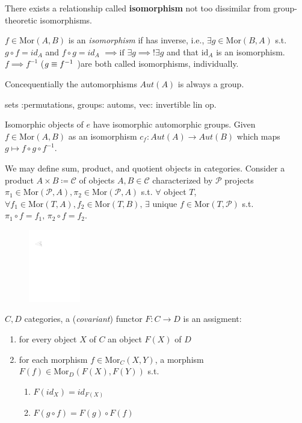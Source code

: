 \documentclass{article}
\begin{document}
There exists a relationship called \textbf{isomorphism} not too dissimilar from group-theoretic isomorphisms. 

\begin{definition}[Isomorphism]
  \( f \in  \text{Mor}(A,B) \) is an \textit{isomorphism} if has inverse, i.e., \( \exists g \in  \text{Mor}(B,A) \) s.t. \( g \circ f =id_A \) and \( f \circ g =id_A \) \( \implies \text{if }\exists g \implies !\exists g \) and that \( \text{id}_A \) is an isomorphism. \( f \implies f^{-1} \) (\( g\equiv f^{-1} \\ \) )are both called isomorphisms, individually. 
  
\end{definition}
  Concequentially the automorphisms \( Aut(A) \) is always a group. 

sets :permutations, groups: automs, vec: invertible lin op. 

Isomorphic objects of \( e \) have isomorphic automorphic groups. Given \( f \in  \text{Mor}(A,B) \) as an isomorphism \( c_f:Aut(A) \to  Aut(B) \) which maps \( g \mapsto f \circ g \circ f^{-1} \). 

We may define sum, product, and quotient objects in categories. Consider a product \( A\times B \coloneqq \mathcal{C} \) of objects \( A,B \in  \mathscr{C} \) characterized by \( \mathcal{P} \) projects \( \pi_1 \in \text{Mor}(\mathcal{P},A), \pi_{2}\in \text{Mor}(\mathcal{P}, A) \) s.t. \( \forall  \) object \( T \), \( \forall f_{1}\in \text{Mor}(T,A), f_{2}\in \text{Mor}(T,B), \, \exists \) unique \( f \in \text{Mor}(T,\mathcal{P}) \) s.t. \( \pi_{1} \circ f =f_1, \, \pi_{2}\circ f=f_{2} \). 

\begin{figure}[ht]
    \centering
 \includegraphics[width=0.2\textwidth]{./figures/tcat.pdf}
    \caption{}
    \label{fig:tcat}
\end{figure}

\begin{definition}[functor]
  \( C,D \) categories, a (\textit{covariant}) functor \( F:C \to  D \) is an assigment:
  \begin{enumerate}
    \item for every object \( X \) of \( C \) an object \( F(X) \) of \( D \)
    \item for each morphism \( f \in  \text{Mor}_C(X,Y) \), a morphism \( F(f) \in  \text{Mor}_D(F(X),F(Y)) \) s.t. \begin{enumerate}
        \item \( F(id_X)=id_{F(X)} \)
        \item \( F(g \circ f)= F(g)\circ F(f) \)
    \end{enumerate}
  \end{enumerate}
\end{definition}
\end{document}

